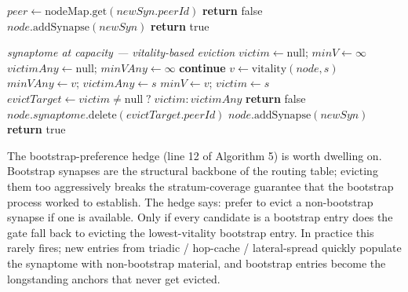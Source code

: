 \documentclass[twoside,nobib]{tufte-book}
\begin{document}
\begin{algorithm}
\caption{addByVitality(node, newSyn)}
\begin{algorithmic}[1]
\State $\mathit{peer} \gets \mathrm{nodeMap.get}(\mathit{newSyn}.\mathit{peerId})$
  \State \textbf{return} false
\EndIf
{}
  \State $\mathit{node}.\mathrm{addSynapse}(\mathit{newSyn})$
  \State \textbf{return} true
\EndIf

\Statex \emph{synaptome at capacity --- vitality-based eviction}
\State $\mathit{victim} \gets \mathrm{null}$;
       $\mathit{minV} \gets \infty$
\State $\mathit{victimAny} \gets \mathrm{null}$;
       $\mathit{minVAny} \gets \infty$
   \textbf{continue}
  \EndIf
  \State $v \gets \mathrm{vitality}(\mathit{node}, s)$
    $\mathit{minVAny} \gets v$;
    $\mathit{victimAny} \gets s$
  \EndIf
    $\mathit{minV} \gets v$;
    $\mathit{victim} \gets s$
  \EndIf
\EndFor
\State $\mathit{evictTarget} \gets \mathit{victim} \neq \mathrm{null}\;?
       \;\mathit{victim} : \mathit{victimAny}$
 \textbf{return} false
\EndIf
\State $\mathit{node}.\mathit{synaptome}.\mathrm{delete}(\mathit{evictTarget}.\mathit{peerId})$
\State $\mathit{node}.\mathrm{addSynapse}(\mathit{newSyn})$
\State \textbf{return} true
\end{algorithmic}
\end{algorithm}

The bootstrap-preference hedge (line 12 of Algorithm 5) is
worth dwelling on. Bootstrap synapses are the structural backbone
of the routing table; evicting them too aggressively breaks the
stratum-coverage guarantee that the bootstrap process worked to
establish. The hedge says: prefer to evict a non-bootstrap
synapse if one is available. Only if every candidate is a
bootstrap entry does the gate fall back to evicting the
lowest-vitality bootstrap entry. In practice this rarely fires;
new entries from triadic / hop-cache / lateral-spread quickly
populate the synaptome with non-bootstrap material, and bootstrap
entries become the longstanding anchors that never get evicted.
\end{document}
